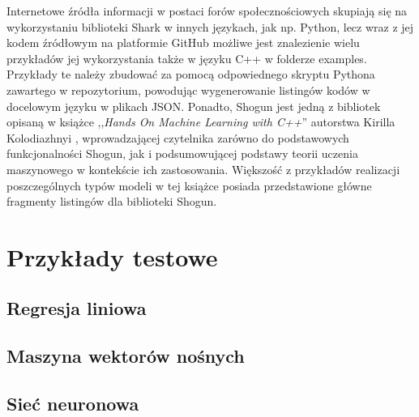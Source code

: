 Internetowe źródła informacji w postaci forów społecznościowych skupiają się na wykorzystaniu biblioteki Shark w innych językach, jak np. Python, lecz wraz z jej kodem źródłowym na platformie GitHub \cite{shogun:github} możliwe jest znalezienie wielu przykładów jej wykorzystania także w języku C++ w folderze examples. Przykłady te należy zbudować za pomocą odpowiednego skryptu Pythona zawartego w repozytorium, powodując wygenerowanie listingów kodów w docelowym języku w plikach JSON. Ponadto, Shogun jest jedną z bibliotek opisaną w książce ,,\textit{Hands On Machine Learning with C++}'' autorstwa Kirilla Kolodiazhnyi \cite{handsOnMachineLearning}, wprowadzającej czytelnika zarówno do podstawowych funkcjonalności Shogun, jak i podsumowującej podstawy teorii uczenia maszynowego w kontekście ich zastosowania. Większość z przykładów realizacji poszczególnych typów modeli w tej książce posiada przedstawione główne fragmenty listingów dla biblioteki Shogun.

\section{Przykłady testowe}

\subsection{Regresja liniowa}
\subsection{Maszyna wektorów nośnych}
\subsection{Sieć neuronowa}